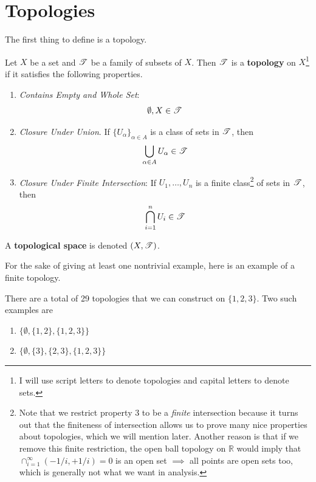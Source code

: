 \section{Topologies} 

  The first thing to define is a topology. 

  \begin{definition}[Topology]
    \label{def:topology}
    Let $X$ be a set and $\operatorname{\mathscr{T}}$ be a family of subsets of $X$. Then $\operatorname{\mathscr{T}}$ is a \textbf{topology} on $X$\footnote{I will use script letters to denote topologies and capital letters to denote sets.} if it satisfies the following properties. 
    \begin{enumerate}
      \item \textit{Contains Empty and Whole Set}: 
      \begin{equation}
        \emptyset, X \in \operatorname{\mathscr{T}}
      \end{equation}

      \item \textit{Closure Under Union}. If $\{U_\alpha\}_{\alpha \in A}$ is a class of sets in $\operatorname{\mathscr{T}}$, then 
      \begin{equation}
        \bigcup_{\alpha \in A} U_\alpha \in \operatorname{\mathscr{T}}
      \end{equation}

      \item \textit{Closure Under Finite Intersection}: If $U_1, \ldots, U_n$ is a finite class\footnote{Note that we restrict property 3 to be a \textit{finite} intersection because it turns out that the finiteness of intersection allows us to prove many nice properties about topologies, which we will mention later. Another reason is that if we remove this finite restriction, the open ball topology on $\mathbb{R}$ would imply that $\cap_{i = 1}^{\infty} ( - 1/i, +1/i ) = 0$ is an open set $\implies$ all points are open sets too, which is generally not what we want in analysis. 
      } of sets in $\operatorname{\mathscr{T}}$, then 
      \begin{equation}
       \bigcap_{i=1}^{n} U_i \in \operatorname{\mathscr{T}}
      \end{equation}
    \end{enumerate}
    A \textbf{topological space} is denoted $(X, \operatorname{\mathscr{T}})$. 
  \end{definition}

  For the sake of giving at least one nontrivial example, here is an example of a finite topology. 

  \begin{example}
    \label{ex:topologies-of-a-set-of-cardinality-3}
    There are a total of 29 topologies that we can construct on $\{1, 2, 3\}$. Two such examples are 
    \begin{enumerate}
      \item $\{\emptyset, \{1, 2\}, \{1, 2, 3\}\}$ 
      \item $\{\emptyset, \{3\}, \{2, 3\}, \{1, 2, 3\}\}$
    \end{enumerate}
  \end{example} 

